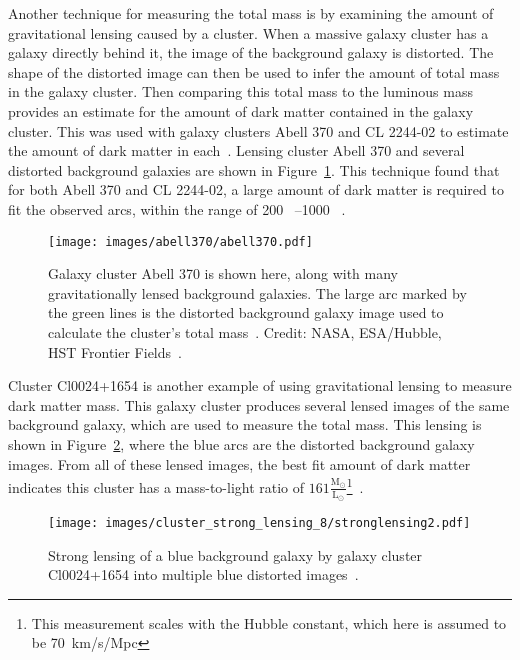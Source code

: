 Another technique for measuring the total mass is by examining the amount of gravitational lensing caused by a cluster.
When a massive galaxy cluster has a galaxy directly behind it, the image of the background galaxy is distorted.
The shape of the distorted image can then be used to infer the amount of total mass in the galaxy cluster.
Then comparing this total mass to the luminous mass provides an estimate for the amount of dark matter contained in the galaxy cluster.
This was used with galaxy clusters Abell 370 and CL 2244-02 to estimate the amount of dark matter in each~\cite{cluster_lensing}.
Lensing cluster Abell 370 and several distorted background galaxies are shown in Figure~\ref{fig:abell370}.
This technique found that for both Abell 370 and CL 2244-02, a large amount of dark matter is required to fit the observed arcs, within the range of \SIrange{200}{1000}{ }.
    
\begin{figure}[!ht]
  \centering
  \texttt{[image: images/abell370/abell370.pdf]}
  \caption[Gravitational Lensing in Abell 370]{
    Galaxy cluster Abell 370 is shown here, along with many gravitationally lensed background galaxies.
    The large arc marked by the green lines is the distorted background galaxy image used to calculate the cluster's total mass~\cite{cluster_lensing}.
    Credit: NASA, ESA/Hubble, HST Frontier Fields~\cite{abell370_hubble}.
  }
  \label{fig:abell370}
\end{figure}
    
Cluster \mbox{Cl0024+1654} is another example of using gravitational lensing to measure dark matter mass.
This galaxy cluster produces several lensed images of the same background galaxy, which are used to measure the total mass.
This lensing is shown in Figure~\ref{fig:stronglens}, where the blue arcs are the distorted background galaxy images.
From all of these lensed images, the best fit amount of dark matter indicates this cluster has a mass-to-light ratio of $161 \frac{\textrm{M}_{\odot}}{\textrm{L}_{\odot}}$\footnote[3]{This measurement scales with the Hubble constant, which here is assumed to be \SI{70}{km/s/Mpc}}~\cite{cluster_strong_lensing_1996, cluster_strong_lensing_1998, cluster_strong_lensing_2010}.
    
\begin{figure}[!ht]
  \centering
  \texttt{[image: images/cluster\_strong\_lensing\_8/stronglensing2.pdf]}
  \caption[Gravitational Lensing in Cl0024+1654]{
    Strong lensing of a blue background galaxy by galaxy cluster Cl0024+1654 into multiple blue distorted images~\cite{cluster_strong_lensing_1996}.
  }
  \label{fig:stronglens}
\end{figure}
    
